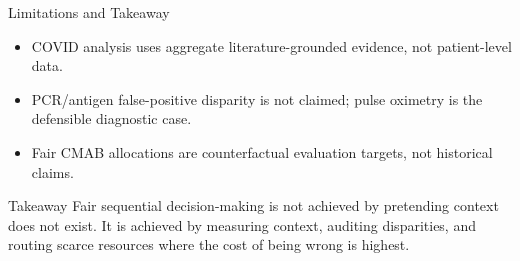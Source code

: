 \begin{frame}{Limitations and Takeaway}
\begin{itemize}
\item COVID analysis uses aggregate literature-grounded evidence, not patient-level data.
\item PCR/antigen false-positive disparity is not claimed; pulse oximetry is the defensible diagnostic case.
\item Fair CMAB allocations are counterfactual evaluation targets, not historical claims.
\end{itemize}
\begin{block}{Takeaway}
Fair sequential decision-making is not achieved by pretending context does not exist. It is achieved by measuring context, auditing disparities, and routing scarce resources where the cost of being wrong is highest.
\end{block}
\end{frame}
